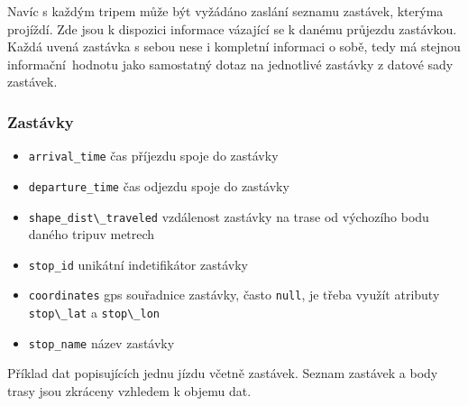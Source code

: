 Navíc s každým tripem může být vyžádáno zaslání seznamu zastávek, kterýma projíždí. Zde jsou k dispozici informace vázající se k danému průjezdu zastávkou. Každá uvená zastávka s sebou nese i kompletní informaci o sobě, tedy má stejnou informační hodnotu jako samostatný dotaz na jednotlivé zastávky z datové sady zastávek.

\subsubsection{Zastávky}

\begin{itemize}
	\item \verb-arrival_time- čas příjezdu spoje do zastávky

	\item \verb-departure_time- čas odjezdu spoje do zastávky

	\item \verb-shape_dist\_traveled- vzdálenost zastávky na trase od výchozího bodu daného tripuv metrech

	\item \verb-stop_id- unikátní indetifikátor zastávky

	\item \verb-coordinates- \gls{gps} souřadnice zastávky, často \verb"null", je třeba využít atributy \verb"stop\_lat" a \verb"stop\_lon"

	\item \verb-stop_name- název zastávky
\end{itemize}

\bigbreak

Příklad dat popisujících jednu jízdu včetně zastávek. Seznam zastávek a body trasy jsou zkráceny vzhledem k objemu dat.

